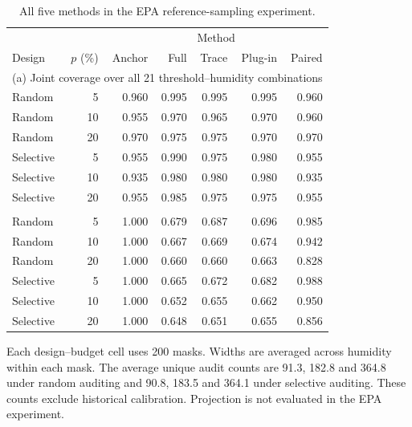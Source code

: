 \begin{table}[htbp]\centering
\caption{All five methods in the EPA reference-sampling experiment.}\label{tab:epa_budget}
\setlength{\tabcolsep}{4pt}
\begin{tabular}{lrrrrrr}\toprule
 & & \multicolumn{5}{c}{Method}\\
Design & $p$ (\%) & Anchor & Full & Trace & Plug-in & Paired \\\midrule
\multicolumn{7}{l}{(a) Joint coverage over all 21 threshold--humidity combinations}\\
Random & 5 & 0.960 & 0.995 & 0.995 & 0.995 & 0.960 \\
Random & 10 & 0.955 & 0.970 & 0.965 & 0.970 & 0.960 \\
Random & 20 & 0.970 & 0.975 & 0.975 & 0.970 & 0.970 \\
Selective & 5 & 0.955 & 0.990 & 0.975 & 0.980 & 0.955 \\
Selective & 10 & 0.935 & 0.980 & 0.980 & 0.980 & 0.935 \\
Selective & 20 & 0.955 & 0.985 & 0.975 & 0.975 & 0.955 \\
\addlinespace[4pt]
\multicolumn{7}{l}{(b) Mean within-mask width ratio to Anchor}\\
Random & 5 & 1.000 & 0.679 & 0.687 & 0.696 & 0.985 \\
Random & 10 & 1.000 & 0.667 & 0.669 & 0.674 & 0.942 \\
Random & 20 & 1.000 & 0.660 & 0.660 & 0.663 & 0.828 \\
Selective & 5 & 1.000 & 0.665 & 0.672 & 0.682 & 0.988 \\
Selective & 10 & 1.000 & 0.652 & 0.655 & 0.662 & 0.950 \\
Selective & 20 & 1.000 & 0.648 & 0.651 & 0.655 & 0.856 \\
\bottomrule\end{tabular}
\par\raggedright\noindent Each design--budget cell uses 200 masks. Widths are averaged across humidity within each mask. The average unique audit counts are 91.3, 182.8 and 364.8 under random auditing and 90.8, 183.5 and 364.1 under selective auditing. These counts exclude historical calibration. Projection is not evaluated in the EPA experiment.
\end{table}
